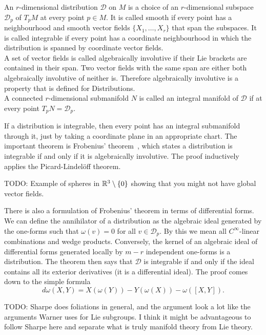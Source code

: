 \begin{definition}
An $r$-dimensional distribution $\mathcal{D}$ on $M$ is a choice of an $r$-dimensional subspace $\mathcal{D}_p$ of $T_p M$ at every point $p \in M$.
It is called smooth if every point has a neighbourhood and smooth vector fields $\{X_1, \dots, X_r \}$ that span the subspaces. 
It is called integrable if every point has a coordinate neighbourhood in which the distribution is spanned by coordinate vector fields.
\\
A set of vector fields is called algebraically involutive if their Lie brackets are contained in their span.
Two vector fields with the same span are either both algebraically involutive of neither is.
Therefore algebraically involutive is a property that is defined for Distributions.\\
A connected $r$-dimensional submanifold $N$ is called an integral manifold of $\mathcal{D}$ if at every point $T_pN = \mathcal{D}_p$.
\\\textup{\cite[2.2.1,.2.2.2,2.3.2]{Sharpe1997}}
\end{definition}

If a distribution is integrable, then every point has an integral submanifold through it, just by taking a coordinate plane in an appropriate chart.
The important theorem is Frobenius' theorem~\cite[2.4.1]{Sharpe1997}, which states a distribution is integrable if and only if it is algebraically involutive.
The proof inductively applies the Picard-Lindelöff theorem.

TODO: Example of spheres in $\mathbb{R}^3\setminus\{0\}$ showing that you might not have global vector fields.

There is also a formulation of Frobenius' theorem in terms of differential forms.
We can define the annihilator of a distribution as the algebraic ideal generated by the one-forms such that $\omega(v) = 0$ for all $v \in \mathcal{D}_p$.
By this we mean all $C^\infty$-linear combinations and wedge products.
Conversely, the kernel of an algebraic ideal of differential forms generated locally by $m-r$ independent one-forms is a distribution.
The theorem then says that $\mathcal{D}$ is integrable if and only if the ideal contains all its exterior derivatives (it is a differential ideal).
The proof comes down to the simple formula
\[
d\omega(X,Y) = X(\omega(Y)) - Y(\omega(X)) - \omega([X,Y]).
\]

TODO: Sharpe does foliations in general, and the argument look a lot like the arguments Warner uses for Lie subgroups.
I think it might be advantageous to follow Sharpe here and separate what is truly manifold theory from Lie theory.


